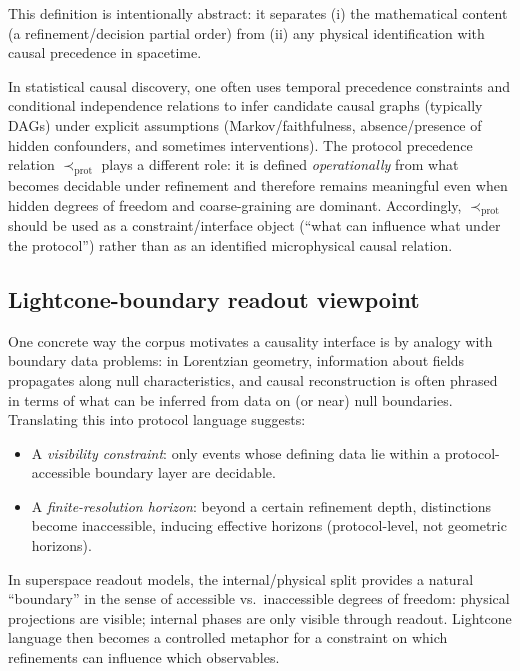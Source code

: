 This definition is intentionally abstract: it separates (i) the mathematical content (a refinement/decision partial order) from (ii) any physical identification with causal precedence in spacetime.

\begin{remark}\label{rem:causality-vs-causal-discovery}
In statistical causal discovery, one often uses temporal precedence constraints and conditional independence relations to infer candidate causal graphs (typically DAGs) under explicit assumptions (Markov/faithfulness, absence/presence of hidden confounders, and sometimes interventions).\cite{Pearl2009Causality,SpirtesGlymourScheines2001CPS,PetersJanzingSchoelkopf2017}
The protocol precedence relation \(\prec_{\mathrm{prot}}\) plays a different role: it is defined \emph{operationally} from what becomes decidable under refinement and therefore remains meaningful even when hidden degrees of freedom and coarse-graining are dominant.
Accordingly, \(\prec_{\mathrm{prot}}\) should be used as a constraint/interface object (``what can influence what under the protocol'') rather than as an identified microphysical causal relation.
\end{remark}

\subsection{Lightcone-boundary readout viewpoint}\label{sec:causality:lightcone}

One concrete way the corpus motivates a causality interface is by analogy with boundary data problems: in Lorentzian geometry, information about fields propagates along null characteristics, and causal reconstruction is often phrased in terms of what can be inferred from data on (or near) null boundaries. Translating this into protocol language suggests:
\begin{itemize}[leftmargin=*,itemsep=2pt]
  \item A \emph{visibility constraint}: only events whose defining data lie within a protocol-accessible boundary layer are decidable.
  \item A \emph{finite-resolution horizon}: beyond a certain refinement depth, distinctions become inaccessible, inducing effective horizons (protocol-level, not geometric horizons).
\end{itemize}

In superspace readout models, the internal/physical split provides a natural ``boundary'' in the sense of accessible vs.\ inaccessible degrees of freedom: physical projections are visible; internal phases are only visible through readout. Lightcone language then becomes a controlled metaphor for a constraint on which refinements can influence which observables.

